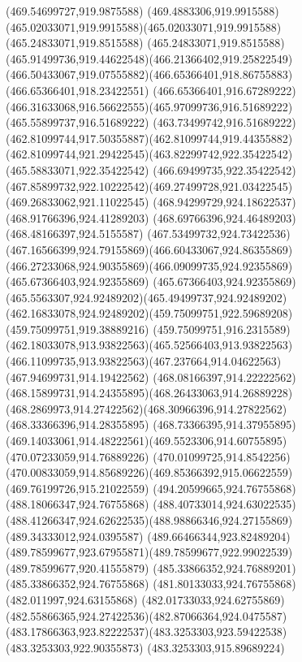 {{		\lineto(469.54699727,919.9875588)
		\curveto(469.4883306,919.9915588)(465.02033071,919.9915588)(465.02033071,919.9915588)
		\lineto(465.24833071,919.8515588)
		\curveto(465.24833071,919.8515588)(465.91499736,919.44622548)(466.21366402,919.25822549)
		\curveto(466.50433067,919.07555882)(466.65366401,918.86755883)(466.65366401,918.23422551)
		\lineto(466.65366401,916.67289222)
		\curveto(466.31633068,916.56622555)(465.97099736,916.51689222)(465.55899737,916.51689222)
		\curveto(463.73499742,916.51689222)(462.81099744,917.50355887)(462.81099744,919.44355882)
		\curveto(462.81099744,921.29422545)(463.82299742,922.35422542)(465.58833071,922.35422542)
		\curveto(466.69499735,922.35422542)(467.85899732,922.10222542)(469.27499728,921.03422545)
		\lineto(469.26833062,921.11022545)
		\lineto(468.94299729,924.18622537)
		\lineto(468.91766396,924.41289203)
		\lineto(468.69766396,924.46489203)
		\lineto(468.48166397,924.5155587)
		\curveto(467.53499732,924.73422536)(467.16566399,924.79155869)(466.60433067,924.86355869)
		\curveto(466.27233068,924.90355869)(466.09099735,924.92355869)(465.67366403,924.92355869)
		\curveto(465.67366403,924.92355869)(465.5563307,924.92489202)(465.49499737,924.92489202)
		\curveto(462.16833078,924.92489202)(459.75099751,922.59689208)(459.75099751,919.38889216)
		\curveto(459.75099751,916.2315589)(462.18033078,913.93822563)(465.52566403,913.93822563)
		\curveto(466.11099735,913.93822563)(467.237664,914.04622563)(467.94699731,914.19422562)
		\curveto(468.08166397,914.22222562)(468.15899731,914.24355895)(468.26433063,914.26889228)
		\curveto(468.2869973,914.27422562)(468.30966396,914.27822562)(468.33366396,914.28355895)
		\curveto(468.73366395,914.37955895)(469.14033061,914.48222561)(469.5523306,914.60755895)
		\lineto(470.07233059,914.76889226)
		\lineto(470.01099725,914.8542256)
		\curveto(470.00833059,914.85689226)(469.85366392,915.06622559)(469.76199726,915.21022559)
		\moveto(494.20599665,924.76755868)
		\lineto(488.18066347,924.76755868)
		\lineto(488.40733014,924.63022535)
		\curveto(488.41266347,924.62622535)(488.98866346,924.27155869)(489.34333012,924.0395587)
		\curveto(489.66466344,923.82489204)(489.78599677,923.67955871)(489.78599677,922.99022539)
		\lineto(489.78599677,920.41555879)
		\lineto(485.33866352,924.76889201)
		\lineto(485.33866352,924.76755868)
		\lineto(481.80133033,924.76755868)
		\lineto(482.011997,924.63155868)
		\curveto(482.01733033,924.62755869)(482.55866365,924.27422536)(482.87066364,924.0475587)
		\curveto(483.17866363,923.82222537)(483.3253303,923.59422538)(483.3253303,922.90355873)
		\lineto(483.3253303,915.89689224)
}}
